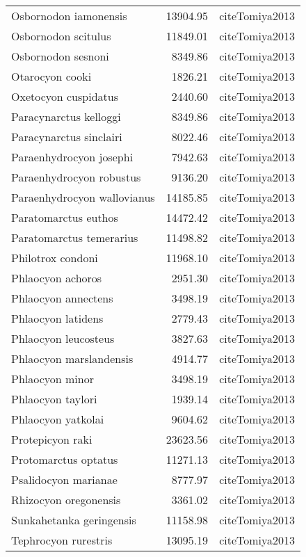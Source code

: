 \begin{table}[ht]
\begin{tabular}{lrl}
  Osbornodon iamonensis & 13904.95 & cite{Tomiya2013} \\ 
  Osbornodon scitulus & 11849.01 & cite{Tomiya2013} \\ 
  Osbornodon sesnoni & 8349.86 & cite{Tomiya2013} \\ 
  Otarocyon cooki & 1826.21 & cite{Tomiya2013} \\ 
  Oxetocyon cuspidatus & 2440.60 & cite{Tomiya2013} \\ 
  Paracynarctus kelloggi & 8349.86 & cite{Tomiya2013} \\ 
  Paracynarctus sinclairi & 8022.46 & cite{Tomiya2013} \\ 
  Paraenhydrocyon josephi & 7942.63 & cite{Tomiya2013} \\ 
  Paraenhydrocyon robustus & 9136.20 & cite{Tomiya2013} \\ 
  Paraenhydrocyon wallovianus & 14185.85 & cite{Tomiya2013} \\ 
  Paratomarctus euthos & 14472.42 & cite{Tomiya2013} \\ 
  Paratomarctus temerarius & 11498.82 & cite{Tomiya2013} \\ 
  Philotrox condoni & 11968.10 & cite{Tomiya2013} \\ 
  Phlaocyon achoros & 2951.30 & cite{Tomiya2013} \\ 
  Phlaocyon annectens & 3498.19 & cite{Tomiya2013} \\ 
  Phlaocyon latidens & 2779.43 & cite{Tomiya2013} \\ 
  Phlaocyon leucosteus & 3827.63 & cite{Tomiya2013} \\ 
  Phlaocyon marslandensis & 4914.77 & cite{Tomiya2013} \\ 
  Phlaocyon minor & 3498.19 & cite{Tomiya2013} \\ 
  Phlaocyon taylori & 1939.14 & cite{Tomiya2013} \\ 
  Phlaocyon yatkolai & 9604.62 & cite{Tomiya2013} \\ 
  Protepicyon raki & 23623.56 & cite{Tomiya2013} \\ 
  Protomarctus optatus & 11271.13 & cite{Tomiya2013} \\ 
  Psalidocyon marianae & 8777.97 & cite{Tomiya2013} \\ 
  Rhizocyon oregonensis & 3361.02 & cite{Tomiya2013} \\ 
  Sunkahetanka geringensis & 11158.98 & cite{Tomiya2013} \\ 
  Tephrocyon rurestris & 13095.19 & cite{Tomiya2013} \\ 

\end{tabular}
\end{table}

